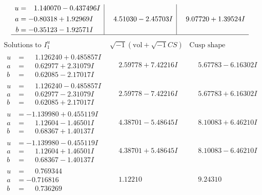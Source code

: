 \documentclass[1p]{elsarticle_modified}
\theoremstyle{definition}
\newcommand{\I}{\sqrt{-1}}
\begin{document}
$$\begin{array}{c|c|c}
\begin{aligned}
u &= \phantom{-}1.140070 - 0.437496 I \\
a &= -0.80318 + 1.92969 I \\
b &= -0.35123 - 1.92571 I\end{aligned}
 & \phantom{-}4.51030 - 2.45703 I & \phantom{-}9.07720 + 1.39524 I\\
 \hline 
 \end{array}$$\newpage$$\begin{array}{c|c|c}  
\text{Solutions to }I^u_{1}& \I (\text{vol} + \sqrt{-1}CS) & \text{Cusp shape}\\
 \hline 
\begin{aligned}
u &= \phantom{-}1.126240 + 0.485857 I \\
a &= \phantom{-}0.62977 + 2.31079 I \\
b &= \phantom{-}0.62085 - 2.17017 I\end{aligned}
 & \phantom{-}2.59778 + 7.42216 I & \phantom{-}5.67783 - 6.16302 I \\ \hline\begin{aligned}
u &= \phantom{-}1.126240 - 0.485857 I \\
a &= \phantom{-}0.62977 - 2.31079 I \\
b &= \phantom{-}0.62085 + 2.17017 I\end{aligned}
 & \phantom{-}2.59778 - 7.42216 I & \phantom{-}5.67783 + 6.16302 I \\ \hline\begin{aligned}
u &= -1.139980 + 0.455119 I \\
a &= \phantom{-}1.12604 - 1.46501 I \\
b &= \phantom{-}0.68367 + 1.40137 I\end{aligned}
 & \phantom{-}4.38701 - 5.48645 I & \phantom{-}8.10083 + 6.46210 I \\ \hline\begin{aligned}
u &= -1.139980 - 0.455119 I \\
a &= \phantom{-}1.12604 + 1.46501 I \\
b &= \phantom{-}0.68367 - 1.40137 I\end{aligned}
 & \phantom{-}4.38701 + 5.48645 I & \phantom{-}8.10083 - 6.46210 I \\ \hline\begin{aligned}
u &= \phantom{-}0.769344\phantom{ +0.000000I} \\
a &= -0.716816\phantom{ +0.000000I} \\
b &= \phantom{-}0.736269\phantom{ +0.000000I}\end{aligned}
 & \phantom{-}1.12210\phantom{ +0.000000I} & \phantom{-}9.24310\phantom{ +0.000000I} \\ \hline\begin{aligned}

\end{aligned}
\end{array}$$
\end{document}
